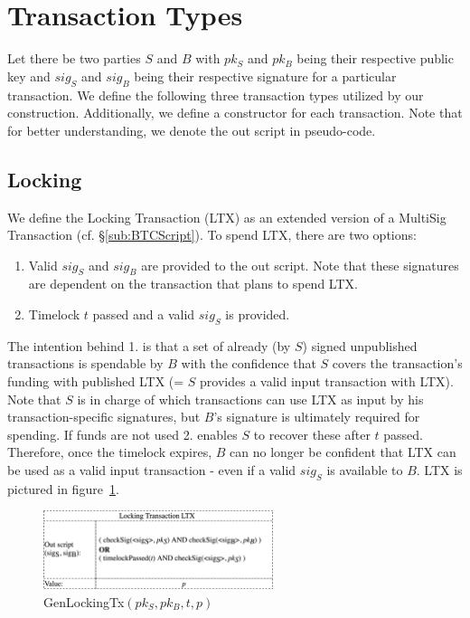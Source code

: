 \documentclass{cacthesis}
\begin{document}
	   \section{Transaction Types}
	   \label{sec:OurTransactionTypes}
        Let there be two parties $S$ and $B$ with $pk_S$ and $pk_B$  being their respective public key and $sig_S$ and $sig_B$ being their respective signature for a particular transaction. We define the following three transaction types utilized by our construction. Additionally, we define a constructor for each transaction. Note that for better understanding, we denote the out script in pseudo-code.
        
        \subsection{Locking}
        \label{sub:LockingTx}
        We define the Locking Transaction (LTX) as an extended version of a MultiSig Transaction (cf. §\ref{sub:BTCScript}). To spend LTX, there are two options:
        \begin{enumerate}
	        \item Valid $sig_S$ and $sig_B$ are provided to the out script. Note that these signatures are dependent on the transaction that plans to spend LTX.
	        \item Timelock $t$ passed and a valid $sig_S$ is provided.
        \end{enumerate}
        The intention behind 1. is that a set of already (by $S$) signed unpublished transactions is spendable by $B$ with the confidence that $S$ covers the transaction's funding with published LTX (= $S$ provides a valid input transaction with LTX). Note that $S$ is in charge of which transactions can use LTX as input by his transaction-specific signatures, but $B$'s signature is ultimately required for spending.
        If funds are not used 2. enables $S$ to recover these after $t$ passed. Therefore, once the timelock expires, $B$ can no longer be confident that LTX can be used as a valid input transaction - even if a valid $sig_S$ is available to $B$. LTX is pictured in \mbox{figure \ref{fig:genLockingTx}}.
        
        \begin{figure}
            \begin{center}
              \includegraphics[width=0.6\textwidth]{images/GenLockingTx.png}
              \caption{\textsf{GenLockingTx}$(pk_S, pk_B, t, p)$}
              \label{fig:genLockingTx}
            \end{center}
        \end{figure}
        
\end{document}

